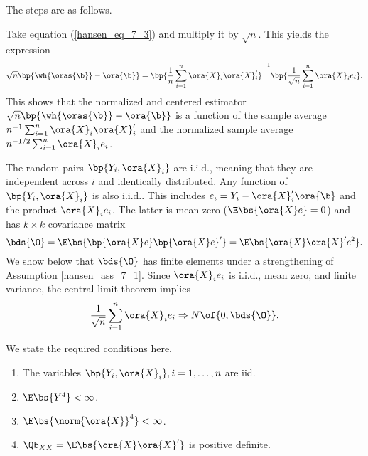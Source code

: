  The steps are as follows.

Take equation (\ref{hansen_eq_7_3}) and multiply it by $\sqrt{n}$. This yields the expression
\begin{equation}
    \label{hansen_eq_7_5}
    \sqrt{n} \bp{\wh{\oras{\b}} - \ora{\b}} = \bp{\frac{1}{n} \sum_{i=1}^n \ora{X}_i \ora{X}_i^\prime}^{-1} \bp{\frac{1}{\sqrt{n}} \sum_{i=1}^{n} \ora{X}_i e_i}.
\end{equation}
This shows that the normalized and centered estimator $\sqrt{n} \bp{\wh{\oras{\b}} - \ora{\b}}$ is a function of the sample average $n^{-1} \sum_{i=1}^n \ora{X}_i \ora{X}_i^\prime$ and the normalized sample average $n^{-1/2} \sum_{i=1}^{n} \ora{X}_i e_i$.

The random pairs $\bp{Y_i, \ora{X}_i}$ are i.i.d., meaning that they are independent across $i$ and identically distributed. Any function of $\bp{Y_i, \ora{X}_i}$ is also i.i.d.. This includes $e_i = Y_i - \ora{X}_i^\prime \ora{\b}$ and the product $\ora{X}_i e_i$. The latter is mean zero ($\E\bs{\ora{X} e} = 0$) and has $k \times k$ covariance matrix
\begin{equation}
    \notag
    \bds{\O} = \E\bs{\bp{\ora{X} e}\bp{\ora{X} e}^\prime} = \E\bs{\ora{X} \ora{X}^\prime e^2} .
\end{equation}
We show below that $\bds{\O}$ has finite elements under a strengthening of Assumption \ref{hansen_ass_7_1}. Since $\ora{X}_i e_i$ is i.i.d., mean zero, and finite variance, the central limit theorem implies 
\begin{equation}
    \notag
    \frac{1}{\sqrt{n}} \sum_{i=1}^{n} \ora{X}_i e_i \Rightarrow N\of{0, \bds{\O}}.
\end{equation}

We state the required conditions here.

\begin{assumption}
    \label{hansen_ass_7_2}

    \begin{enumerate}[topsep=0pt, leftmargin=20pt, itemsep=0pt, label=(\arabic*)]
        \setlength{\parskip}{10pt} 
        \item The variables $\bp{Y_i, \ora{X}_i}, i=1, \ldots, n$ are iid.
        \item $\E\bs{Y^4} < \infty$.
        \item $\E\bs{\norm{\ora{X}}^4} < \infty$.
        \item $\Qb_{XX} = \E\bs{\ora{X}\ora{X}^\prime}$ is positive definite.
    \end{enumerate}
\end{assumption}

